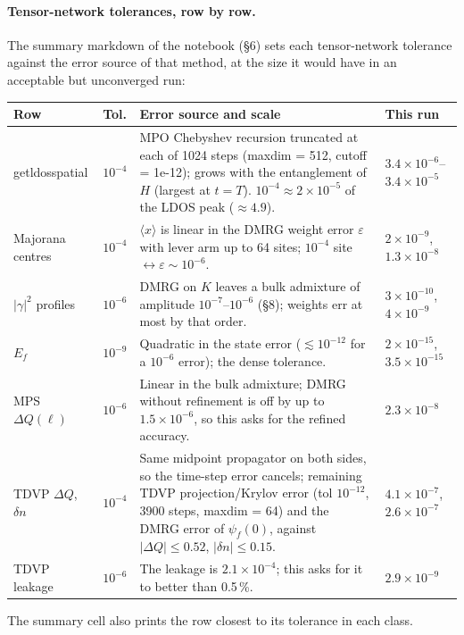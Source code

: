 \documentclass[11pt]{article}
\newcommand{\codeus}{\textunderscore\allowbreak}
\renewcommand{\code}[1]{{\ttfamily\let\_\codeus #1}}
\begin{document}
\paragraph{Tensor-network tolerances, row by row.} The summary markdown of the notebook (§6) sets each tensor-network tolerance against the error
source of that method, at the size it would have in an acceptable but unconverged run:
\begin{center}\small
\begin{tabular}{@{}p{3.1cm}lp{8.2cm}l@{}}
\toprule
Row & Tol. & Error source and scale & This run\\
\midrule
\code{get\_ldos\_spatial} & $10^{-4}$ & MPO Chebyshev recursion truncated at each of 1024 steps (\code{maxdim = 512}, \code{cutoff = 1e-12}); grows with the entanglement of $H$ (largest at $t=T$). $10^{-4}\approx2\times10^{-5}$ of the LDOS peak ($\approx4.9$). & $3.4\times10^{-6}$--$3.4\times10^{-5}$\\
Majorana centres & $10^{-4}$ & $\langle x\rangle$ is linear in the DMRG weight error $\varepsilon$ with lever arm up to 64 sites; $10^{-4}$ site $\leftrightarrow\varepsilon\sim10^{-6}$. & $2\times10^{-9}$, $1.3\times10^{-8}$\\
$|\gamma|^2$ profiles & $10^{-6}$ & DMRG on $K$ leaves a bulk admixture of amplitude $10^{-7}$--$10^{-6}$ (§8); weights err at most by that order. & $3\times10^{-10}$, $4\times10^{-9}$\\
$E_f$ & $10^{-9}$ & Quadratic in the state error ($\lesssim10^{-12}$ for a $10^{-6}$ error); the dense tolerance. & $2\times10^{-15}$, $3.5\times10^{-15}$\\
MPS $\Delta Q(\ell)$ & $10^{-6}$ & Linear in the bulk admixture; DMRG without refinement is off by up to $1.5\times10^{-6}$, so this asks for the refined accuracy. & $2.3\times10^{-8}$\\
TDVP $\Delta Q$, $\delta n$ & $10^{-4}$ & Same midpoint propagator on both sides, so the time-step error cancels; remaining TDVP projection/Krylov error (tol $10^{-12}$, 3900 steps, \code{maxdim = 64}) and the DMRG error of $\psi_f(0)$, against $|\Delta Q|\le0.52$, $|\delta n|\le0.15$. & $4.1\times10^{-7}$, $2.6\times10^{-7}$\\
TDVP leakage & $10^{-6}$ & The leakage is $2.1\times10^{-4}$; this asks for it to better than 0.5\,\%. & $2.9\times10^{-9}$\\
\bottomrule
\end{tabular}
\end{center}
The summary cell also prints the row closest to its tolerance in each class.
\end{document}
